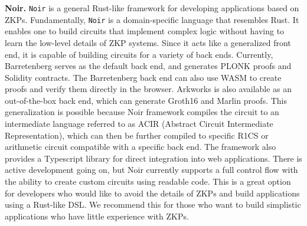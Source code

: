 \textbf{Noir.}
\texttt{Noir} \cite{Noir2023Documentation} is a general Rust-like framework for developing applications based on ZKPs. Fundamentally, \texttt{Noir} is a domain-specific language that resembles Rust. It enables one to build circuits that implement complex logic without having to learn the low-level details of ZKP systems. Since it acts like a generalized front end, it is capable of building circuits for a variety of back ends. Currently, Barretenberg \cite{AztecProtocol2023Barretenberg} serves as the default back end, and generates PLONK proofs and Solidity contracts. The Barretenberg back end can also use WASM to create proofs and verify them directly in the browser. Arkworks is also available as an out-of-the-box back end, which can generate Groth16 and Marlin proofs. This generalization is possible because Noir framework compiles the circuit to an intermediate language referred to as ACIR (Abstract Circuit Intermediate Representation), which can then be further compiled to specific R1CS or arithmetic circuit compatible with a specific back end. The framework also provides a Typescript library for direct integration into web applications. There is active development going on, but Noir currently supports a full control flow with the ability to create custom circuits using readable code. This is a great option for developers who would like to avoid the details of ZKPs and build applications using a Rust-like DSL. We recommend this for those who want to build simplistic applications who have little experience with ZKPs.



